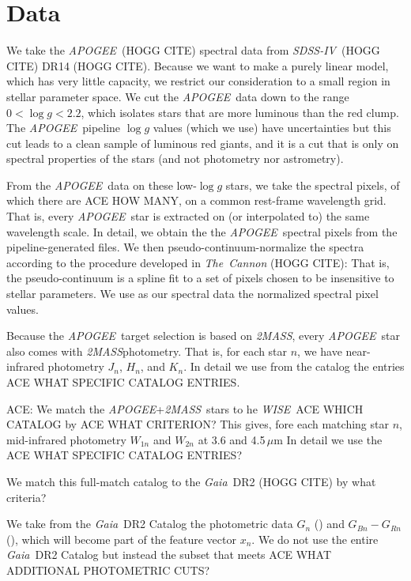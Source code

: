 \documentclass[modern]{aastex62}
\newcommand{\code}[1]{\texttt{\detokenize{#1}}}
\newcommand{\acronym}[1]{{\small{#1}}}
\newcommand{\project}[1]{\textsl{#1}}
\newcommand{\apogee}{\project{\acronym{APOGEE}}}
\newcommand{\gaia}{\project{Gaia}}
\newcommand{\wise}{\project{\acronym{WISE}}}
\newcommand{\zmass}{\project{\acronym{2MASS}}}
\newcommand{\sdssiv}{\project{\acronym{SDSS-IV}}}
\newcommand{\logg}{\log g}
\begin{document}
\section{Data}

We take the \apogee\ (HOGG CITE) spectral data
from \sdssiv\ (HOGG CITE) \acronym{DR14} (HOGG CITE).
Because we want to make a purely linear model, which has very little capacity,
we restrict our consideration to a small region in stellar parameter space.
We cut the \apogee\ data down to the range $0<\logg<2.2$, which isolates
stars that are more luminous than the red clump.
The \apogee\ pipeline $\logg$ values (which we use) have uncertainties but
this cut leads to a clean sample of luminous red giants, and it is a cut
that is only on spectral properties of the stars (and not photometry nor astrometry).

From the \apogee\ data on these low-$\logg$ stars, we take the spectral pixels,
of which there are ACE HOW MANY, on a common rest-frame wavelength grid.
That is, every \apogee\ star is extracted on (or interpolated to)
the same wavelength scale.
In detail, we obtain the
the \apogee\ spectral pixels from the pipeline-generated \code{ACE whatever} files.
We then pseudo-continuum-normalize the spectra according to the procedure developed
in \project{The~Cannon} (HOGG CITE): That is, the pseudo-continuum is a spline fit to a set
of pixels chosen to be insensitive to stellar parameters.
We use as our spectral data the normalized spectral pixel values.

Because the \apogee\ target selection is based on \zmass, every \apogee\ star
also comes with \zmass photometry.
That is, for each star $n$,
we have near-infrared photometry $J_n$, $H_n$, and $K_n$.
In detail we use from the catalog the entries ACE WHAT SPECIFIC CATALOG ENTRIES.

ACE: We match the \apogee+\zmass\ stars to he \wise\ ACE WHICH CATALOG by ACE WHAT CRITERION?
This gives, fore each matching star $n$,
mid-infrared photometry $W_{1n}$ and $W_{2n}$ at 3.6 and 4.5\,$\mu$m
In detail we use the ACE WHAT SPECIFIC CATALOG ENTRIES?

We match this full-match catalog to the \gaia\ \acronym{DR2} (HOGG CITE) by what criteria?

We take from the \gaia\ \acronym{DR2} Catalog the photometric data $G_n$
(\code{phot_g_mean_mag}) and $G_{Bn}-G_{Rn}$ (\code{bp_rp}), which will
become part of the feature vector $x_n$.
We do not use the entire \gaia\ \acronym{DR2} Catalog but instead the subset
that meets ACE WHAT ADDITIONAL PHOTOMETRIC CUTS?
\end{document}
